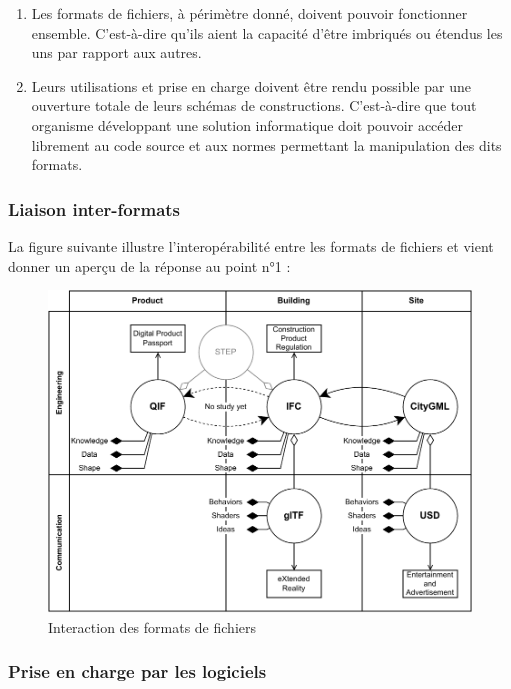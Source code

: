 \begin{enumerate}
    \item Les formats de fichiers, à périmètre donné, doivent pouvoir fonctionner ensemble. C'est-à-dire qu'ils aient la capacité d'être imbriqués ou étendus les uns par rapport aux autres.
    \item Leurs utilisations et prise en charge doivent être rendu possible par une ouverture totale de leurs schémas de constructions. C'est-à-dire que tout organisme développant une solution informatique doit pouvoir accéder librement au code source et aux normes permettant la manipulation des dits formats.
\end{enumerate}

\subsubsection{Liaison inter-formats}

La figure suivante illustre l'interopérabilité entre les formats de fichiers et vient donner un aperçu de la réponse au point n°1 :

\begin{figure}[!h]
    \centering
    \includegraphics[width=1\linewidth]{imports/3DFiles_Intrication.pdf}
    \caption{Interaction des formats de fichiers}
    \label{fig:enter-label}
\end{figure}

\subsubsection{Prise en charge par les logiciels}

